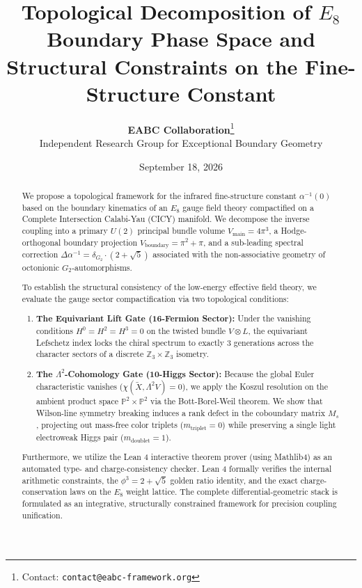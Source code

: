 \documentclass[11pt,a4paper]{article}
\title{\textbf{Topological Decomposition of $E_8$ Boundary Phase Space and Structural Constraints on the Fine-Structure Constant}}
\author{
    \textbf{EABC Collaboration}\thanks{Contact: \texttt{contact@eabc-framework.org}} \\
    \small Independent Research Group for Exceptional Boundary Geometry
}
\date{September 18, 2026}
\theoremstyle{remark}
\begin{document}
\maketitle

\begin{abstract}
We propose a topological framework for the infrared fine-structure constant $\alpha^{-1}(0)$ based on the boundary kinematics of an $E_8$ gauge field theory compactified on a Complete Intersection Calabi-Yau (CICY) manifold. We decompose the inverse coupling into a primary $U(2)$ principal bundle volume $V_{\text{main}} = 4\pi^3$, a Hodge-orthogonal boundary projection $V_{\text{boundary}} = \pi^2 + \pi$, and a sub-leading spectral correction $\Delta\alpha^{-1} = \delta_{G_2} \cdot (2 + \sqrt{5})$ associated with the non-associative geometry of octonionic $G_2$-automorphisms. 

To establish the structural consistency of the low-energy effective field theory, we evaluate the gauge sector compactification via two topological conditions:
\begin{enumerate}[label=\arabic*.]
    \item \textbf{The Equivariant Lift Gate ($\mathbf{16}$-Fermion Sector):} Under the vanishing conditions $H^0 = H^2 = H^3 = 0$ on the twisted bundle $V \otimes L$, the equivariant Lefschetz index locks the chiral spectrum to exactly 3 generations across the character sectors of a discrete $\mathbb{Z}_3 \times \mathbb{Z}_3$ isometry.
    \item \textbf{The $\Lambda^2$-Cohomology Gate ($\mathbf{10}$-Higgs Sector):} Because the global Euler characteristic vanishes ($\chi(\widetilde{X}, \Lambda^2 V) = 0$), we apply the Koszul resolution on the ambient product space $\mathbb{P}^2 \times \mathbb{P}^2$ via the Bott-Borel-Weil theorem. We show that Wilson-line symmetry breaking induces a rank defect in the coboundary matrix $M_s$, projecting out mass-free color triplets ($m_{\text{triplet}} = 0$) while preserving a single light electroweak Higgs pair ($m_{\text{doublet}} = 1$).
\end{enumerate}
Furthermore, we utilize the Lean 4 interactive theorem prover (using Mathlib4) as an automated type- and charge-consistency checker. Lean 4 formally verifies the internal arithmetic constraints, the $\phi^3 = 2 + \sqrt{5}$ golden ratio identity, and the exact charge-conservation laws on the $E_8$ weight lattice. The complete differential-geometric stack is formulated as an integrative, structurally constrained framework for precision coupling unification.
\end{abstract}
\end{document}
